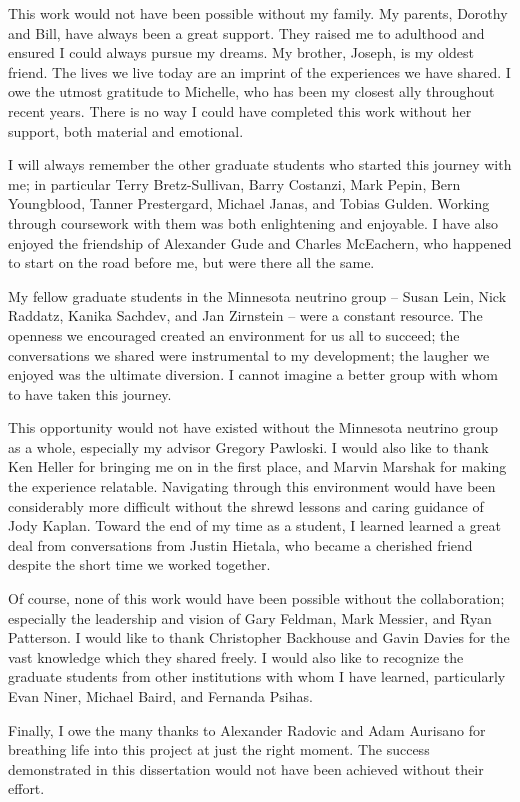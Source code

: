 This work would not have been possible without my family.
My parents, Dorothy and Bill, have always been a great support.
They raised me to adulthood and ensured I could always pursue
my dreams.
My brother, Joseph, is my oldest friend.
The lives we live today are an imprint of the experiences we have shared.
I owe the utmost gratitude to Michelle, who has been my closest ally
throughout recent years.
There is no way I could have completed this work without her support,
both material and emotional.

I will always remember the other graduate students who
started this journey with me; in particular
Terry Bretz-Sullivan, Barry Costanzi, Mark Pepin, Bern Youngblood,
Tanner Prestergard, Michael Janas, and Tobias Gulden.
Working through coursework with them was both enlightening and
enjoyable.
I have also enjoyed the friendship of Alexander Gude and Charles McEachern,
who happened to start on the road before me, but were there all the same.

My fellow graduate students in the Minnesota neutrino group --
Susan Lein, Nick Raddatz, Kanika Sachdev, and Jan Zirnstein  --
were a constant resource.
The openness we encouraged created an environment for us all to succeed;
the conversations we shared were instrumental to my development;
the laugher we enjoyed was the ultimate diversion.
I cannot imagine a better group with whom to have taken this journey.

This opportunity would not have existed without the Minnesota neutrino group
as a whole, especially my advisor Gregory Pawloski.
I would also like to thank Ken Heller for bringing me on in the first place,
and Marvin Marshak for making the experience relatable.
Navigating through this environment would have been considerably more
difficult without the shrewd lessons and caring guidance of Jody Kaplan.
Toward the end of my time as a student, I learned learned a great deal from
conversations from Justin Hietala, who became a cherished friend despite the
short time we worked together.

Of course, none of this work would have been possible without the \nova
collaboration; especially the leadership and vision of Gary Feldman,
Mark Messier, and Ryan Patterson.
I would like to thank Christopher Backhouse and Gavin Davies
for the vast knowledge which they shared freely.
I would also like to recognize the graduate students from
other institutions with whom I have learned, particularly
Evan Niner, Michael Baird, and Fernanda Psihas.

Finally, I owe the many thanks to Alexander Radovic and Adam Aurisano
for breathing life into this project at just the right moment.
The success demonstrated in this dissertation
would not have been achieved without their effort.

